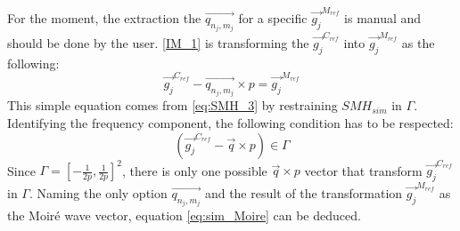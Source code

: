 \documentclass[12pt]{article}
\begin{document}
For the moment, the extraction the $\overrightarrow{q_{n_j,m_j}}$ for a specific $ \overrightarrow{g_j}^{M_{ref}}$ is manual and should be done by the user. \cref{IM_1} is transforming the $\overrightarrow{g_j}^{C_{ref}}$ into $\overrightarrow{g_j}^{M_{ref}}$ as the following:
\begin{equation}
\label{eq:sim_Moire}
{\overrightarrow{g_j}^{C_{ref}}}-\overrightarrow{q_{n_j,m_j}}\times p =  \overrightarrow{g_j}^{M_{ref}}
\end{equation}
This simple equation comes from \cref{eq:SMH_3} by restraining $SMH_{sim}$ in $\Gamma$. Identifying the frequency component, the following condition has to be respected:
\begin{equation*}
(\overrightarrow{g_j}^{C_{ref}}-\overrightarrow{q}\times p) \in \Gamma
\end{equation*}
Since $\Gamma = [-\frac{1}{2p},\frac{1}{2p}]^{2}$, there is only one possible $\overrightarrow{q}\times p$ vector that transform $\overrightarrow{g_j}^{C_{ref}}$ in $\Gamma$. Naming the only option $\overrightarrow{q_{n_j,m_j}}$ and the result of the transformation $\overrightarrow{g_j}^{M_{ref}}$ as the Moir{\'e} wave vector, equation \cref{eq:sim_Moire} can be deduced.
\end{document}
